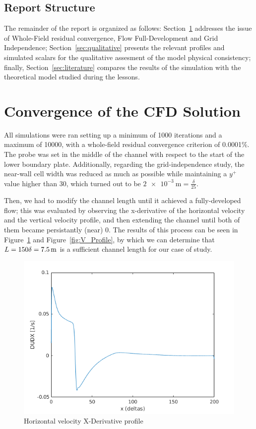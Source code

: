 \documentclass[12pt]{article}
\begin{document}
        \subsection{Report Structure}

                The remainder of the report is organized as follows: Section~\ref{sec:convergence} addresses the issue of Whole-Field residual convergence, Flow Full-Development and Grid Independence; Section~\ref{sec:qualitative} presents the relevant profiles and simulated scalars for the qualitative assesment of the model physical consistency; finally, Section~\ref{sec:literature} compares the results of the simulation with the theoretical model studied during the lessons.

\section{Convergence of the CFD Solution} \label{sec:convergence}

        All simulations were ran setting up a minimum of 1000 iterations and a maximum of 10000, with a whole-field residual convergence criterion of 0.0001\%. The probe was set in the middle of the channel with respect to the start of the lower boundary plate. Additionally, regarding the grid-independence study, the near-wall cell width was reduced as much as possible while maintaining a \( y^+ \) value higher than 30, which turned out to be \( \SI{2e-3}{\metre} = \frac{\delta}{25} \).

        Then, we had to modify the channel length until it achieved a fully-developed flow; this was evaluated by observing the x-derivative of the horizontal velocity and the vertical velocity profile, and then extending the channel until both of them became persistantly (near) 0. The results of this process can be seen in Figure~\ref{fig:DUDX_Profile} and Figure~\ref{fig:V_Profile}, by which we can determine that $ L = 150 \delta =  \SI{7.5E0}{\metre}$ is a sufficient channel length for our case of study.

        \begin{figure}[ht!]
                \centering
                \includegraphics[width=\textwidth]{DUDX_Profile.png}
                \caption{Horizontal velocity X-Derivative profile}
                \label{fig:DUDX_Profile}
        \end{figure}
\end{document}
